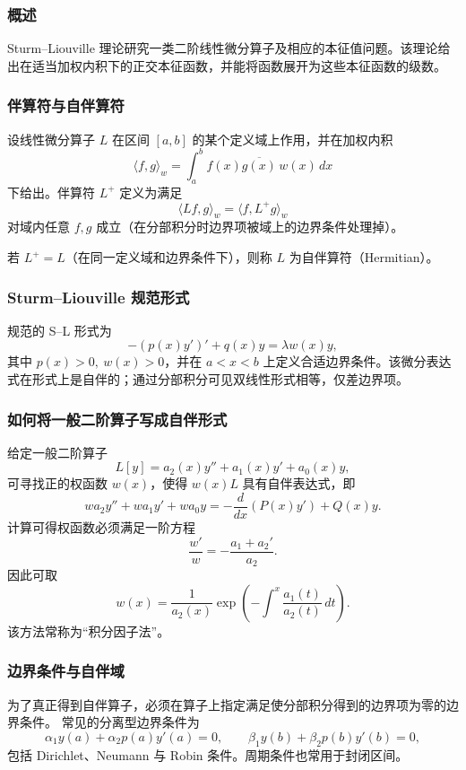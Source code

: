 \subsubsection{概述}
Sturm--Liouville 理论研究一类二阶线性微分算子及相应的本征值问题。该理论给出在适当加权内积下的正交本征函数，并能将函数展开为这些本征函数的级数。

\subsubsection{伴算符与自伴算符}
\begin{definition}
设线性微分算子 $L$ 在区间 $[a,b]$ 的某个定义域上作用，并在加权内积
\[
\langle f,g\rangle_w=\int_a^b f(x)\overline{g(x)}\,w(x)\,dx
\]
下给出。伴算符 $L^+$ 定义为满足
\[
\langle Lf,g\rangle_w = \langle f, L^+ g\rangle_w
\]
对域内任意 $f,g$ 成立（在分部积分时边界项被域上的边界条件处理掉）。
\end{definition}

\begin{definition}
若 $L^+=L$（在同一定义域和边界条件下），则称 $L$ 为自伴算符（Hermitian）。
\end{definition}

\subsubsection{Sturm--Liouville 规范形式}
规范的 S--L 形式为
\[
-(p(x)y')' + q(x)y = \lambda w(x) y,
\]
其中 $p(x)>0,\ w(x)>0$，并在 $a<x<b$ 上定义合适边界条件。该微分表达式在形式上是自伴的；通过分部积分可见双线性形式相等，仅差边界项。

\subsubsection{如何将一般二阶算子写成自伴形式}
给定一般二阶算子
\[
L[y]=a_2(x)y''+a_1(x)y'+a_0(x)y,
\]
可寻找正的权函数 $w(x)$，使得 $w(x)L$ 具有自伴表达式，即
\[
w a_2 y'' + w a_1 y' + w a_0 y = -\frac{d}{dx}(P(x) y') + Q(x) y.
\]
计算可得权函数必须满足一阶方程
\[
\frac{w'}{w} = -\frac{a_1 + a_2'}{a_2}.
\]
因此可取
\[
w(x)=\frac{1}{a_2(x)}\exp\left(-\int^x \frac{a_1(t)}{a_2(t)}\,dt\right).
\]
该方法常称为“积分因子法”。

\subsubsection{边界条件与自伴域}
为了真正得到自伴算子，必须在算子上指定满足使分部积分得到的边界项为零的边界条件。
常见的分离型边界条件为
\[
\alpha_1 y(a)+\alpha_2 p(a) y'(a)=0,\qquad \beta_1 y(b)+\beta_2 p(b) y'(b)=0,
\]
包括 Dirichlet、Neumann 与 Robin 条件。周期条件也常用于封闭区间。

